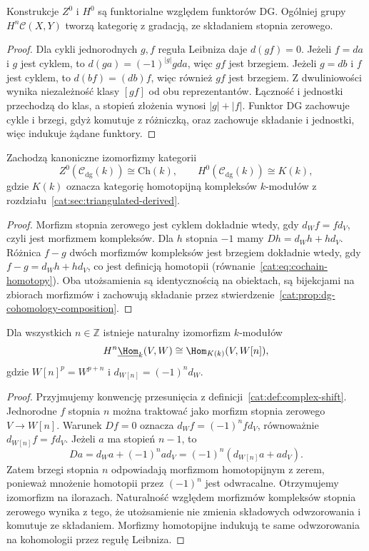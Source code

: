 \begin{stwierdzenie}\label{cat:prop:dg-cohomology-composition}
Konstrukcje $Z^0$ i $H^0$ są funktorialne względem funktorów DG. Ogólniej grupy $H^n\mathcal C(X,Y)$ tworzą kategorię z gradacją, ze składaniem stopnia zerowego.
\end{stwierdzenie}
\begin{proof}
Dla cykli jednorodnych $g,f$ reguła Leibniza daje $d(gf)=0$. Jeżeli $f=da$ i $g$ jest cyklem, to $d(ga)=(-1)^{|g|}gda$, więc $gf$ jest brzegiem. Jeżeli $g=db$ i $f$ jest cyklem, to $d(bf)=(db)f$, więc również $gf$ jest brzegiem. Z dwuliniowości wynika niezależność klasy $[gf]$ od obu reprezentantów. Łączność i jednostki przechodzą do klas, a stopień złożenia wynosi $|g|+|f|$. Funktor DG zachowuje cykle i brzegi, gdyż komutuje z różniczką, oraz zachowuje składanie i jednostki, więc indukuje żądane funktory.
\end{proof}

\begin{stwierdzenie}\label{cat:prop:dg-homotopy-category}
Zachodzą kanoniczne izomorfizmy kategorii
\[
 Z^0(\mathcal C_{\mathrm{dg}}(k))\cong\mathrm{Ch}(k),
 \qquad
 H^0(\mathcal C_{\mathrm{dg}}(k))\cong K(k),
\]
gdzie $K(k)$ oznacza kategorię homotopijną kompleksów $k$-modułów z rozdziału~\ref{cat:sec:triangulated-derived}.
\end{stwierdzenie}
\begin{proof}
Morfizm stopnia zerowego jest cyklem dokładnie wtedy, gdy $d_Wf=fd_V$, czyli jest morfizmem kompleksów. Dla $h$ stopnia $-1$ mamy $Dh=d_Wh+hd_V$. Różnica $f-g$ dwóch morfizmów kompleksów jest brzegiem dokładnie wtedy, gdy $f-g=d_Wh+hd_V$, co jest definicją homotopii (równanie~\eqref{cat:eq:cochain-homotopy}). Oba utożsamienia są identycznością na obiektach, są bijekcjami na zbiorach morfizmów i zachowują składanie przez stwierdzenie~\ref{cat:prop:dg-cohomology-composition}.
\end{proof}

\begin{stwierdzenie}\label{cat:prop:dg-hom-shift}
Dla wszystkich $n\in\mathbb Z$ istnieje naturalny izomorfizm $k$-modułów
\[
 H^n\underline{\Hom}_k(V,W)
 \cong \Hom_{K(k)}(V,W[n]),
\]
gdzie $W[n]^p=W^{p+n}$ i $d_{W[n]}=(-1)^n d_W$.
\end{stwierdzenie}
\begin{proof}
Przyjmujemy konwencję przesunięcia z definicji~\ref{cat:def:complex-shift}. Jednorodne $f$ stopnia $n$ można traktować jako morfizm stopnia zerowego $V\to W[n]$. Warunek $Df=0$ oznacza $d_Wf=(-1)^nf d_V$, równoważnie $d_{W[n]}f=fd_V$. Jeżeli $a$ ma stopień $n-1$, to
\[
 Da=d_Wa+(-1)^n a d_V
 =(-1)^n(d_{W[n]}a+a d_V).
\]
Zatem brzegi stopnia $n$ odpowiadają morfizmom homotopijnym z zerem, ponieważ mnożenie homotopii przez $(-1)^n$ jest odwracalne. Otrzymujemy izomorfizm na ilorazach. Naturalność względem morfizmów kompleksów stopnia zerowego wynika z tego, że utożsamienie nie zmienia składowych odwzorowania i komutuje ze składaniem. Morfizmy homotopijne indukują te same odwzorowania na kohomologii przez regułę Leibniza.
\end{proof}

